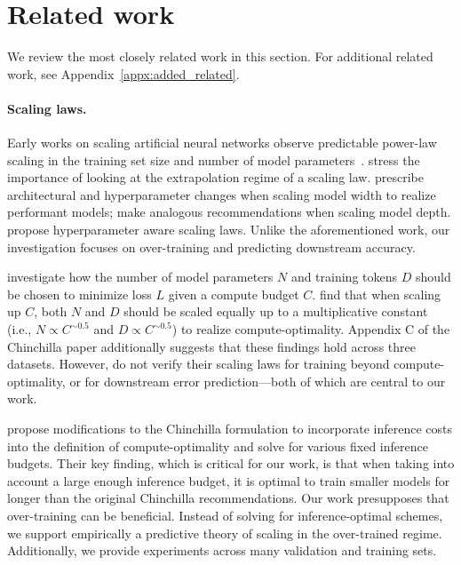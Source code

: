 \section{Related work}
\label{sec:related}
We review the most closely related work in this section.
For additional related work, see Appendix~\ref{appx:added_related}.

\paragraph{Scaling laws.}
Early works on scaling artificial neural networks observe predictable power-law scaling in the training set size and number of model parameters~\cite{og_scaling,hestness2019beyond,rosenfeld_ConstructivePredictionGeneralization_2020}. 
\citet{alabdulmohsin2022revisiting} stress the importance of looking at the extrapolation regime of a scaling law.
\citet{yang2022tensor} prescribe architectural and hyperparameter changes when scaling model width to realize performant models; \citet{yang2023tensor} make analogous recommendations when scaling model depth.
\citet{Bi2024DeepSeekLS} propose hyperparameter aware scaling laws.
Unlike the aforementioned work, our investigation focuses on over-training and predicting downstream accuracy.

\citet{chinchilla} investigate how the number of model parameters $N$ and training tokens $D$ should be chosen to minimize loss $L$ given a compute budget $C$.
\citet{chinchilla} find that when scaling up $C$, both $N$ and $D$ should be scaled equally up to a multiplicative constant (i.e., $N \propto C^{\sim 0.5}$ and $D \propto C^{\sim 0.5}$) to realize compute-optimality.
Appendix C of the Chinchilla paper additionally suggests that these findings hold across three datasets.
However, \citet{chinchilla} do not verify their scaling laws for training beyond compute-optimality, or for downstream error prediction---both of which are central to our work. 

\citet{Sardana2023Beyond} propose modifications to the Chinchilla formulation to incorporate inference costs into the definition of compute-optimality and solve for various fixed inference budgets.
Their key finding, which is critical for our work, is that when taking into account a large enough inference budget, it is optimal to train smaller models for longer than the original Chinchilla recommendations.
Our work presupposes that over-training can be beneficial.
Instead of solving for inference-optimal schemes, we support empirically a predictive theory of scaling in the over-trained regime.
Additionally, we provide experiments across many validation and training sets.

